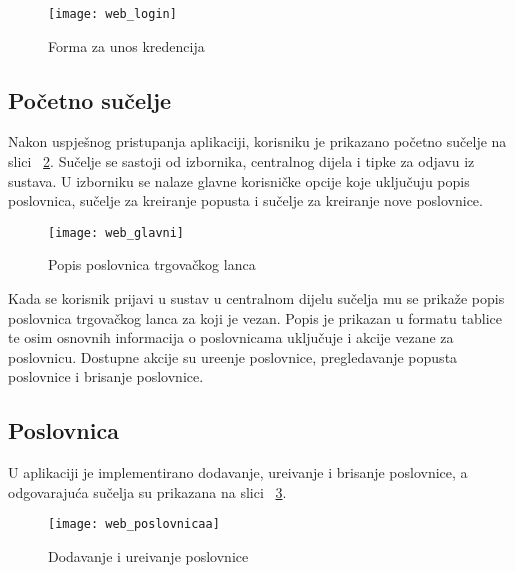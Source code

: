 \begin{figure}[!htbp]
	\begin{center}
 \texttt{[image: web\_login]}
 \caption{Forma za unos kredencija}
 \label{fig:webLogin}
	\end{center}
\end{figure}


\subsection{Po\v{c}etno su\v{c}elje}

Nakon uspje\v{s}nog pristupanja aplikaciji, korisniku je prikazano po\v{c}etno su\v{c}elje na slici ~\ref{fig:web_glavni}. Su\v{c}elje se sastoji od izbornika, centralnog dijela i tipke za odjavu iz sustava. U izborniku se nalaze glavne korisni\v{c}ke opcije koje uklju\v{c}uju popis poslovnica, su\v{c}elje za kreiranje popusta i su\v{c}elje za kreiranje nove poslovnice.


\begin{figure}[!htbp]
	\begin{center}
 \texttt{[image: web\_glavni]}
 \caption{Popis poslovnica trgova\v{c}kog lanca}
 \label{fig:web_glavni}
	\end{center}
\end{figure}

Kada se korisnik prijavi u sustav u centralnom dijelu su\v{c}elja mu se prika\v{z}e popis poslovnica trgova\v{c}kog lanca za koji je vezan. Popis je prikazan u formatu tablice te osim osnovnih informacija o poslovnicama uklju\v{c}uje i akcije vezane za poslovnicu. Dostupne akcije su ure\dj enje poslovnice, pregledavanje popusta poslovnice i brisanje poslovnice.


\subsection{Poslovnica}

U aplikaciji je implementirano dodavanje, ure\dj ivanje i brisanje poslovnice, a odgovaraju\'{c}a su\v{c}elja su prikazana na slici ~\ref{fig:web_poslovnicaa}.

\begin{figure}[!htbp]
	\begin{center}
 \texttt{[image: web\_poslovnicaa]}
 \caption{Dodavanje i ure\dj ivanje poslovnice}
 \label{fig:web_poslovnicaa}
	\end{center}
\end{figure}

